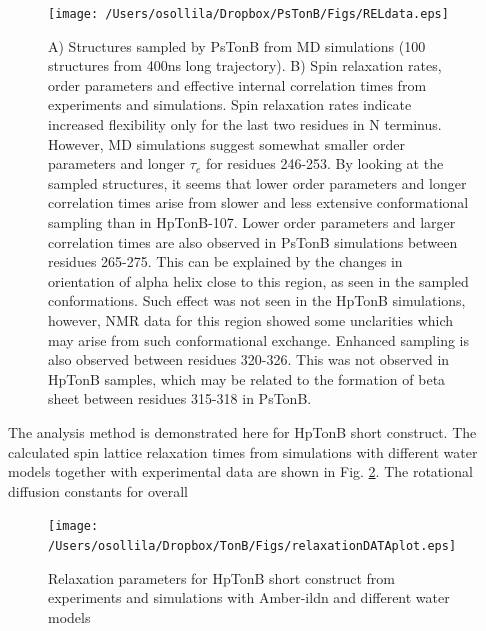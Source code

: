 \documentclass[pre,aps,floatfix,authordate1-4]{revtex4-1}
\begin{document}
\begin{figure}[!p]
  \texttt{[image: /Users/osollila/Dropbox/PsTonB/Figs/RELdata.eps]}%
  \caption{A) Structures sampled by PsTonB from MD simulations
    (100 structures from 400ns long trajectory).
    B) Spin relaxation rates, order parameters and effective internal correlation
    times from experiments and simulations. Spin relaxation rates indicate increased flexibility
    only for the last two residues in N terminus. However,
    MD simulations suggest somewhat smaller order parameters and longer $\tau_e$
    for residues 246-253. By looking at the sampled structures, it seems that lower
    order parameters and longer correlation times arise from slower and less extensive
    conformational sampling than in HpTonB-107. Lower order parameters and larger
    correlation times are also observed in PsTonB simulations between residues 265-275.
    This can be explained by the changes in orientation of alpha helix close to this
    region, as seen in the sampled conformations. Such effect was not seen in the HpTonB
    simulations, however, NMR data for this region showed some unclarities which may arise
    from such conformational exchange. Enhanced sampling is also observed between
    residues 320-326. This was not observed in HpTonB samples, which may be related to the
    formation of beta sheet between residues 315-318 in PsTonB.
    \label{HpTonB92}}%
\end{figure}

The analysis method is demonstrated here for HpTonB short construct.
The calculated spin lattice relaxation times from simulations with different
water models together with experimental data \cite{??} are shown in Fig. \ref{relaxationDATAplot}.
The rotational diffusion constants for overall 

\begin{figure}[!h]
  \texttt{[image: /Users/osollila/Dropbox/TonB/Figs/relaxationDATAplot.eps]}%
  \caption{Relaxation parameters for HpTonB short construct from
    experiments and simulations with Amber-ildn and different water models
    \label{relaxationDATAplot}}%
\end{figure}
\end{document}
